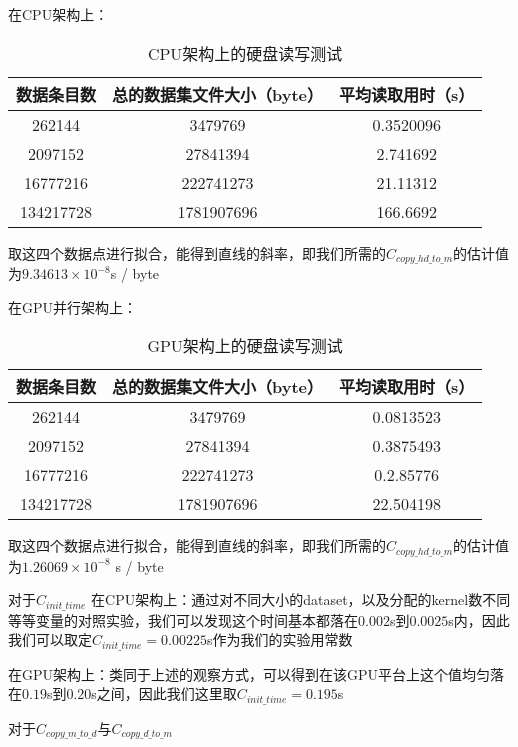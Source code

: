 在CPU架构上：
\begin{table}[!htbp]
\centering
\caption{CPU架构上的硬盘读写测试} 
\label{tab:table1}
\begin{tabular}{|c|c|c|}
    \hline
    数据条目数 & 总的数据集文件大小（byte） & 平均读取用时（s）\\
    \hline
    262144 & 3479769 & 0.3520096\\
    \hline
    2097152 & 27841394 & 2.741692\\
    \hline
    16777216 & 222741273 & 21.11312\\
    \hline
    134217728 & 1781907696 & 166.6692\\
    \hline
\end{tabular}
\end{table}

取这四个数据点进行拟合，能得到直线的斜率，即我们所需的$C_{copy\_hd\_to\_m}$的估计值为$9.34613 \times 10^{-8}$s / byte

在GPU并行架构上：

\begin{table}[!htbp]
\centering
\caption{GPU架构上的硬盘读写测试} 
\label{tab:table2}
\begin{tabular}{|c|c|c|}
    \hline
    数据条目数 & 总的数据集文件大小（byte） & 平均读取用时（s）\\
    \hline
    262144 & 3479769 & 0.0813523\\
    \hline
    2097152 & 27841394 & 0.3875493\\
    \hline
    16777216 & 222741273 & 0.2.85776\\
    \hline
    134217728 & 1781907696 & 22.504198\\
    \hline
\end{tabular}
\end{table}

取这四个数据点进行拟合，能得到直线的斜率，即我们所需的$C_{copy\_hd\_to\_m}$的估计值为$1.26069 \times 10^{-8}$ s / byte

对于$C_{init\_time}$
在CPU架构上：通过对不同大小的dataset，以及分配的kernel数不同等等变量的对照实验，我们可以发现这个时间基本都落在$0.002$s到$0.0025$s内，因此我们可以取定$C_{init\_time} = 0.00225$s作为我们的实验用常数

在GPU架构上：类同于上述的观察方式，可以得到在该GPU平台上这个值均匀落在$0.19$s到$0.20$s之间，因此我们这里取$C_{init\_time} = 0.195$s

对于$C_{copy\_m\_to\_d}$与$C_{copy\_d\_to\_m}$

